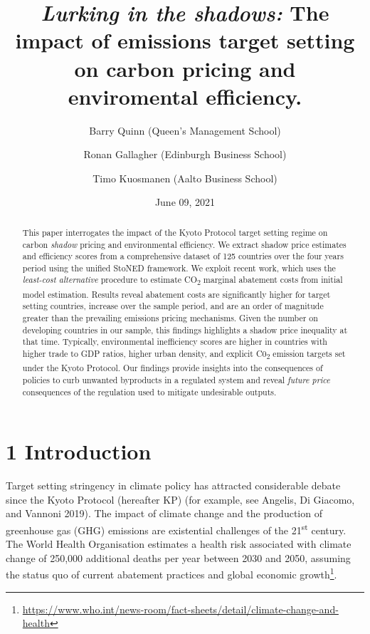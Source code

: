 \documentclass[
  10pt,
]{article}
\title{\emph{Lurking in the shadows:} The impact of emissions target setting on
carbon pricing and enviromental efficiency.}
\author{Barry Quinn (Queen's Management School) \and Ronan Gallagher (Edinburgh Business School) \and Timo Kuosmanen (Aalto Business School)}
\date{June 09, 2021}
\begin{document}
\maketitle
\begin{abstract}
This paper interrogates the impact of the Kyoto Protocol target setting
regime on carbon \emph{shadow} pricing and environmental efficiency. We
extract shadow price estimates and efficiency scores from a
comprehensive dataset of 125 countries over the four years period using
the unified StoNED framework. We exploit recent work, which uses the
\emph{least-cost alternative} procedure to estimate CO\textsubscript{2}
marginal abatement costs from initial model estimation. Results reveal
abatement costs are significantly higher for target setting countries,
increase over the sample period, and are an order of magnitude greater
than the prevailing emissions pricing mechanisms. Given the number on
developing countries in our sample, this findings highlights a shadow
price inequality at that time. Typically, environmental inefficiency
scores are higher in countries with higher trade to GDP ratios, higher
urban density, and explicit C0\textsubscript{2} emission targets set
under the Kyoto Protocol. Our findings provide insights into the
consequences of policies to curb unwanted byproducts in a regulated
system and reveal \emph{future price} consequences of the regulation
used to mitigate undesirable outputs.
\end{abstract}

\hypertarget{introduction}{%
\section{1 Introduction}\label{introduction}}

Target setting stringency in climate policy has attracted considerable
debate since the Kyoto Protocol (hereafter KP) (for example, see
Angelis, Di Giacomo, and Vannoni 2019). The impact of climate change and
the production of greenhouse gas (GHG) emissions are existential
challenges of the 21\textsuperscript{st} century. The World Health
Organisation estimates a health risk associated with climate change of
250,000 additional deaths per year between 2030 and 2050, assuming the
status quo of current abatement practices and global economic
growth\footnote{\url{https://www.who.int/news-room/fact-sheets/detail/climate-change-and-health}}.
\end{document}
